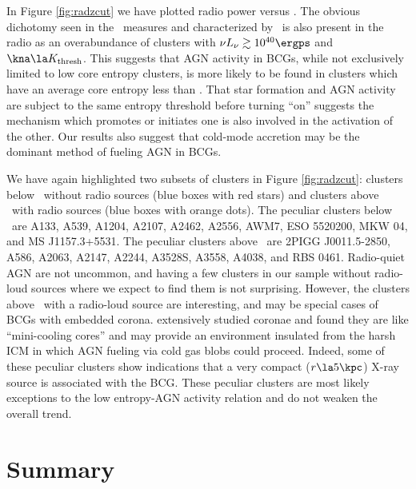\documentclass{emulateapj}
\begin{document}
In Figure \ref{fig:radzcut} we have plotted radio power versus \kna.
The obvious dichotomy seen in the \halpha\ measures and characterized
by \kthr\, is also present in the radio as an overabundance of
clusters with $\nu L_{\nu} \gtrsim 10^{40} \ergps$ and $\kna \la
\kthr$.  This suggests that AGN activity in BCGs, while not
exclusively limited to low core entropy clusters, is more likely to be
found in clusters which have an average core entropy less than
\kthr. That star formation and AGN activity are subject to the same
entropy threshold before turning ``on'' suggests the mechanism which
promotes or initiates one is also involved in the activation of the
other. Our results also suggest that cold-mode accretion
\citep{pizzolato05, hardcastle07} may be the dominant method of
fueling AGN in BCGs.

We have again highlighted two subsets of clusters in Figure
\ref{fig:radzcut}: clusters below \kthr\ without radio sources (blue
boxes with red stars) and clusters above \kthr\ with radio sources
(blue boxes with orange dots). The peculiar clusters below \kthr\ are
A133, A539, A1204, A2107, A2462, A2556, AWM7, ESO 5520200, MKW 04, and
MS J1157.3+5531. The peculiar clusters above \kthr\ are 2PIGG
J0011.5-2850, A586, A2063, A2147, A2244, A3528S, A3558, A4038, and RBS
0461. Radio-quiet AGN are not uncommon, and having a few clusters in
our sample without radio-loud sources where we expect to find them is
not surprising. However, the clusters above \kthr\ with a radio-loud
source are interesting, and may be special cases of BCGs with embedded
corona. \cite{coronae} extensively studied coronae and found they are
like ``mini-cooling cores'' and may provide an environment insulated
from the harsh ICM in which AGN fueling via cold gas blobs could
proceed. Indeed, some of these peculiar clusters show indications that
a very compact ($r \la 5\kpc$) X-ray source is associated with the
BCG. These peculiar clusters are most likely exceptions to the low
entropy-AGN activity relation and do not weaken the overall trend.

\section{Summary}
\label{sec:diss}
\end{document}
